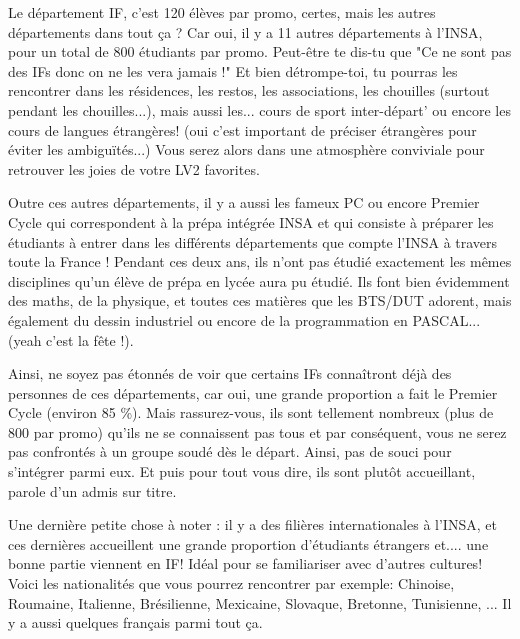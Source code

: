 Le département IF, c'est 120 élèves par promo, certes, mais les autres départements dans tout ça ?
Car oui, il y a 11 autres départements à l'INSA, pour un total de 800 étudiants par promo.
Peut-être te dis-tu que "Ce ne sont pas des IFs donc on ne les vera jamais !"
Et bien détrompe-toi, tu pourras les rencontrer dans les résidences, les restos,
les associations, les chouilles (surtout pendant les chouilles...), mais
aussi les... cours de sport inter-départ' ou encore les cours de langues
étrangères! (oui c'est important de préciser étrangères pour éviter les
ambiguïtés...) Vous serez alors dans une atmosphère conviviale pour
retrouver les joies de votre LV2 favorites.

Outre ces autres départements, il y a aussi les fameux PC ou encore Premier
Cycle qui correspondent à la prépa intégrée INSA et qui consiste à préparer les
étudiants à entrer dans les différents départements que compte l'INSA à travers
toute la France ! Pendant ces deux ans, ils n'ont pas étudié exactement les
mêmes disciplines qu'un élève de prépa en lycée aura pu étudié. Ils font bien
évidemment des maths, de la physique, et toutes ces matières que les BTS/DUT
adorent, mais également du dessin industriel ou encore de la programmation en
PASCAL... (yeah c'est la fête !).


Ainsi, ne soyez pas étonnés de voir que certains IFs connaîtront déjà des
personnes de ces départements, car oui, une grande proportion a fait le Premier
Cycle (environ 85 \%). Mais rassurez-vous, ils sont tellement nombreux  (plus de
800 par promo) qu'ils ne se connaissent pas tous et par conséquent, vous
ne serez pas confrontés à un groupe soudé dès le départ. Ainsi, pas de souci
pour s'intégrer parmi eux. Et puis pour tout vous dire, ils sont plutôt
accueillant, parole d'un admis sur titre.

Une dernière petite chose à noter : il y a des filières internationales à
l'INSA, et ces dernières accueillent une grande proportion d'étudiants étrangers
et.... une bonne partie viennent en IF! Idéal pour se familiariser avec d'autres
cultures! Voici les nationalités que vous pourrez rencontrer par exemple:
Chinoise, Roumaine, Italienne, Brésilienne, Mexicaine, Slovaque, Bretonne,
Tunisienne, ... Il y a aussi quelques français parmi tout ça.
